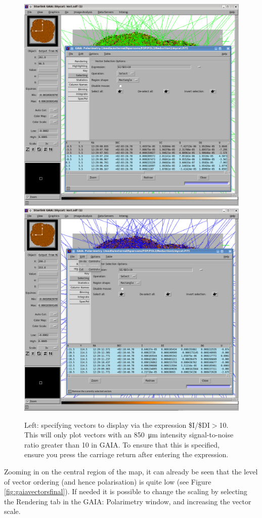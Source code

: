 \begin{figure}[t!]
\begin{center}
\includegraphics[width=0.46\linewidth]{sc22-gaia-plot-vectors-4.png}
\includegraphics[width=0.46\linewidth]{sc22-gaia-plot-vectors-6.png}
\caption [Selecting Vectors in GAIA]{Left: specifying vectors
  to display via the expression \$I/\$DI$>$10. This will only plot
  vectors with an \SI{850}{\micro\metre} intensity signal-to-noise
  ratio greater than 10 in GAIA. To ensure that this is specified,
  ensure you press the carriage return after entering the expression.
}
\label{fig:gaiavectorssecond}
\end{center}
\end{figure}

Zooming in on the central region of the map, it can already be seen
that the level of vector ordering (and hence polarisation) is quite
low (see Figure \ref{fig:gaiavectorsfinal}). If needed it is
possible to change the scaling by selecting the Rendering tab in the
GAIA: Polarimetry window, and increasing the vector scale.


